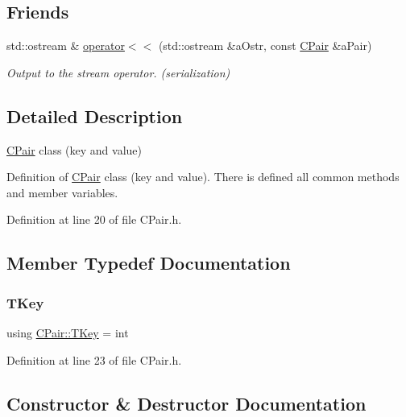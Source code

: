 \subsection*{Friends}
\begin{DoxyCompactItemize}
\item 
std\+::ostream \& \hyperlink{class_c_pair_aaad355ee4d63c4f36941574235f8dd3d}{operator$<$$<$} (std\+::ostream \&a\+Ostr, const \hyperlink{class_c_pair}{C\+Pair} \&a\+Pair)
\begin{DoxyCompactList}\small\item\em Output to the stream operator. ({\itshape serialization}) \end{DoxyCompactList}\end{DoxyCompactItemize}


\subsection{Detailed Description}
\hyperlink{class_c_pair}{C\+Pair} class (key and value) 

Definition of \hyperlink{class_c_pair}{C\+Pair} class (key and value). There is defined all common methods and member variables. 

Definition at line 20 of file C\+Pair.\+h.



\subsection{Member Typedef Documentation}
\mbox{\label{class_c_pair_a9030f3ef2a07301c105bdf17620ae66a}} 
\subsubsection{\texorpdfstring{T\+Key}{TKey}}
{\footnotesize\ttfamily using \hyperlink{class_c_pair_a9030f3ef2a07301c105bdf17620ae66a}{C\+Pair\+::\+T\+Key} =  int}



Definition at line 23 of file C\+Pair.\+h.



\subsection{Constructor \& Destructor Documentation}
\mbox{\label{class_c_pair_a0f94617ac6e7649aa0259587b6863361}} 
